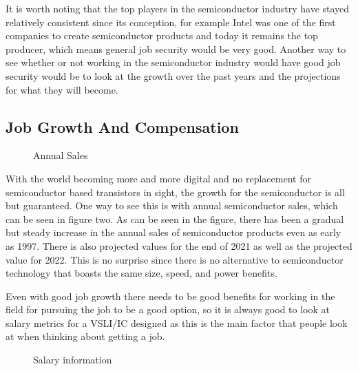 \documentclass{article}
\begin{document}
It is worth noting that the top players in the semiconductor industry have stayed relatively consistent since its conception, for example Intel was one of the first companies to create semiconductor products and today it remains the top producer, which means general job security would be very good. Another way to see whether or not working in the semiconductor industry would have good job security would be to look at the growth over the past years and the projections for what they will become. 


\subsection*{Job Growth And Compensation}
\begin{figure}
  \begin{center}
  \end{center}
  \caption{Annual Sales}
\end{figure}
With the world becoming more and more digital and no replacement for semiconductor based transistors in sight, the growth for the semiconductor is all but guaranteed. One way to see this is with annual semiconductor sales, which can be seen in figure two. As can be seen in the figure, there has been a gradual but steady increase in the annual sales of semiconductor products even as early as 1997. There is also projected values for the end of 2021 as well as the projected value for 2022. This is no surprise since there is no alternative to semiconductor technology that boasts the same size, speed, and power benefits.

Even with good job growth there needs to be good benefits for working in the field for pursuing the job to be a good option, so it is always good to look at salary metrics for a VSLI/IC designed as this is the main factor that people look at when thinking about getting a job.

\newpage

\begin{figure}
  \begin{center}
  \end{center}
  \caption{Salary information}
\end{figure}
\end{document}
